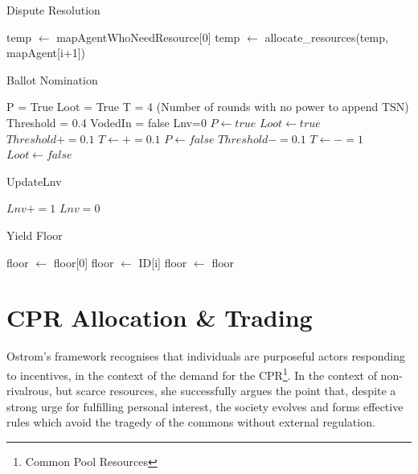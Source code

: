 \begin{algorithm}
\begin{algorithmic}
\caption{Dispute Resolution}
\State temp $\leftarrow$ mapAgentWhoNeedResource[0]
\State temp $\leftarrow$ allocate\_resources(temp, mapAgent[i+1])
\EndWhile
\end{algorithmic}
\end{algorithm}



\begin{algorithm}
\caption{Ballot Nomination}
\begin{algorithmic}
\State P = True
\State Loot = True
\State T = 4   (Number of rounds with no power to append TSN)
\State Threshold = 0.4
\State VodedIn = false
\State Lnv=0
\State
{}
\State $P \leftarrow true$
\State $Loot \leftarrow true$
\State $Threshold += 0.1$
\State $T \leftarrow += 0.1$
\Else
{}
\State $P \leftarrow false$
\State $Threshold -= 0.1$
\State $T \leftarrow -= 1$
\EndIf
{}
\State $Loot \leftarrow false$
\EndIf
\EndIf
\end{algorithmic}
\end{algorithm}


\begin{algorithm}
\caption{UpdateLnv}
\begin{algorithmic}
\State $Lnv += 1$
\Else
\State $Lnv = 0$
\EndIf
\end{algorithmic}
\end{algorithm}


\begin{algorithm}
\caption{Yield Floor}
\begin{algorithmic}
\State floor $\leftarrow$ floor[0]
\State floor $\leftarrow$ ID[i]
\Else
\State floor $\leftarrow$ floor
\EndIf
\EndWhile
\end{algorithmic}
\end{algorithm}


\vspace{1cm}
\section{CPR Allocation \& Trading}

Ostrom's framework recognises that individuals are purposeful actors responding to incentives, in the context of the demand for the CPR\footnote{Common Pool Resources}. In the context of non-rivalrous, but scarce resources, she successfully argues the point that, despite a strong urge for fulfilling personal interest, the society evolves and forms effective rules which avoid the tragedy of the commons without external regulation.

